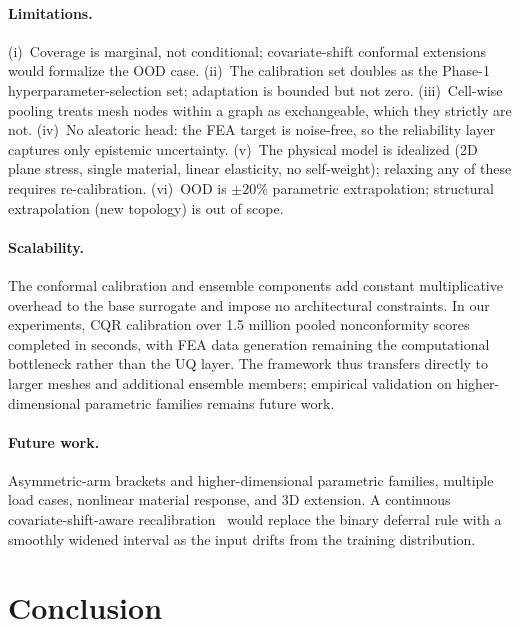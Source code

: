 \documentclass{article}
\begin{document}
\paragraph{Limitations.} (i)~Coverage is marginal, not conditional;
covariate-shift conformal extensions~\citep{angelopoulos2023conformal}
would formalize the OOD case. (ii)~The calibration set doubles as the
Phase-1 hyperparameter-selection set; adaptation is bounded but not
zero. (iii)~Cell-wise pooling treats mesh nodes within a graph as
exchangeable, which they strictly are not. (iv)~No aleatoric head: the
FEA target is noise-free, so the reliability layer captures only
epistemic uncertainty. (v)~The physical model is idealized (2D plane
stress, single material, linear elasticity, no self-weight); relaxing
any of these requires re-calibration. (vi)~OOD is $\pm 20\%$
parametric extrapolation; structural extrapolation (new topology) is
out of scope.

\paragraph{Scalability.} The conformal calibration and ensemble
components add constant multiplicative overhead to the base surrogate
and impose no architectural constraints. In our experiments, CQR
calibration over 1.5 million pooled nonconformity scores completed in
seconds, with FEA data generation remaining the computational
bottleneck rather than the UQ layer. The framework thus transfers
directly to larger meshes and additional ensemble members; empirical
validation on higher-dimensional parametric families remains future
work.

\paragraph{Future work.} Asymmetric-arm brackets and higher-dimensional
parametric families, multiple load cases, nonlinear material response,
and 3D extension. A continuous covariate-shift-aware
recalibration~\citep{angelopoulos2023conformal} would replace the
binary deferral rule with a smoothly widened interval as the input
drifts from the training distribution.

\section{Conclusion}
\end{document}
